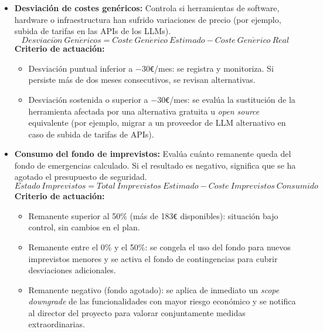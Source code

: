 \documentclass[11pt, letterpaper]{article}
\begin{document}
\begin{itemize}
    \item \textbf{Desviación de costes genéricos:} Controla si herramientas de software, hardware o infraestructura han sufrido variaciones de precio (por ejemplo, subida de tarifas en las APIs de los LLMs).
    \begin{equation}
        Desviaci\acute{o}n\ Gen\acute{e}ricos = Coste\ Gen\acute{e}rico\ Estimado - Coste\ Gen\acute{e}rico\ Real
    \end{equation}
    \textbf{Criterio de actuación:}
    \begin{itemize}
        \item Desviación puntual inferior a $-$30\verb|€|/mes: se registra y monitoriza. Si persiste más de dos meses consecutivos, se revisan alternativas.
        \item Desviación sostenida o superior a $-$30\verb|€|/mes: se evalúa la sustitución de la herramienta afectada por una alternativa gratuita u \textit{open source} equivalente (por ejemplo, migrar a un proveedor de LLM alternativo en caso de subida de tarifas de APIs).
    \end{itemize}

    \item \textbf{Consumo del fondo de imprevistos:} Evalúa cuánto remanente queda del fondo de emergencias calculado. Si el resultado es negativo, significa que se ha agotado el presupuesto de seguridad.
    \begin{equation}
        Estado\ Imprevistos = Total\ Imprevistos\ Estimado - Coste\ Imprevistos\ Consumido
    \end{equation}
    \textbf{Criterio de actuación:}
    \begin{itemize}
        \item Remanente superior al 50\% (más de 183\verb|€| disponibles): situación bajo control, sin cambios en el plan.
        \item Remanente entre el 0\% y el 50\%: se congela el uso del fondo para nuevos imprevistos menores y se activa el fondo de contingencias para cubrir desviaciones adicionales.
        \item Remanente negativo (fondo agotado): se aplica de inmediato un \textit{scope downgrade} de las funcionalidades con mayor riesgo económico y se notifica al director del proyecto para valorar conjuntamente medidas extraordinarias.
    \end{itemize}
\end{itemize}

\newpage
\end{document}
